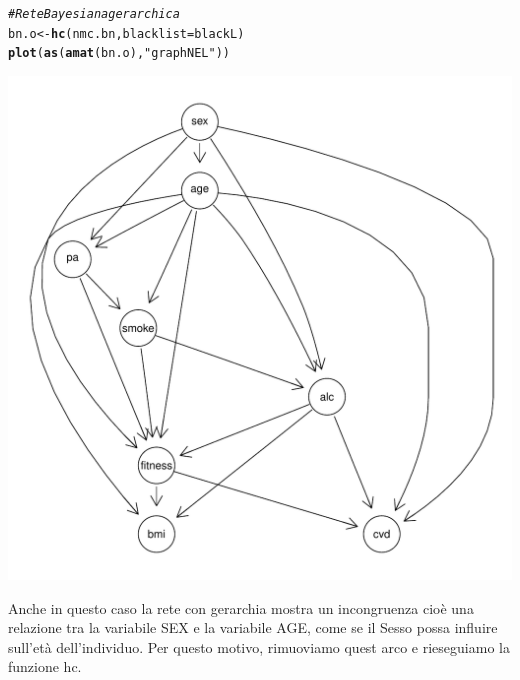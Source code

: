 \documentclass{article}\usepackage[]{graphicx}\usepackage[]{xcolor}
\makeatletter
\def\maxwidth{ %
  \ifdim\Gin@nat@width>\linewidth
    \linewidth
  \else
    \Gin@nat@width
  \fi
}
\newcommand{\hlstr}[1]{\textcolor[rgb]{0.192,0.494,0.8}{#1}}%
\newcommand{\hlcom}[1]{\textcolor[rgb]{0.678,0.584,0.686}{\textit{#1}}}%
\newcommand{\hlstd}[1]{\textcolor[rgb]{0.345,0.345,0.345}{#1}}%
\newcommand{\hlkwb}[1]{\textcolor[rgb]{0.69,0.353,0.396}{#1}}%
\newcommand{\hlkwc}[1]{\textcolor[rgb]{0.333,0.667,0.333}{#1}}%
\newcommand{\hlkwd}[1]{\textcolor[rgb]{0.737,0.353,0.396}{\textbf{#1}}}%
\newenvironment{kframe}{%
 \def\at@end@of@kframe{}%
 \ifinner\ifhmode%
  \def\at@end@of@kframe{\end{minipage}}%
  \begin{minipage}{\columnwidth}%
 \fi\fi%
 \def\FrameCommand##1{\hskip\@totalleftmargin \hskip-\fboxsep
 \colorbox{shadecolor}{##1}\hskip-\fboxsep
     \hskip-\linewidth \hskip-\@totalleftmargin \hskip\columnwidth}%
 \MakeFramed {\advance\hsize-\width
   \@totalleftmargin\z@ \linewidth\hsize
   \@setminipage}}%
 {\par\unskip\endMakeFramed%
 \at@end@of@kframe}
\newenvironment{knitrout}{}{} %
\makeatother
\begin{document}
\begin{knitrout}
\color{fgcolor}\begin{kframe}
\begin{alltt}
\hlcom{#Rete Bayesiana gerarchica}
\hlstd{bn.o} \hlkwb{<-} \hlkwd{hc}\hlstd{(nmc.bn,} \hlkwc{blacklist}\hlstd{=blackL)}
\hlkwd{plot}\hlstd{(}\hlkwd{as}\hlstd{(}\hlkwd{amat}\hlstd{(bn.o),} \hlstr{"graphNEL"}\hlstd{))}
\end{alltt}
\end{kframe}
\includegraphics[width=\maxwidth]{figure/Rete_bayesiana_gerarchica-1} 
\end{knitrout}
    
    Anche in questo caso la rete con gerarchia mostra un incongruenza cioè una
    relazione tra la variabile SEX e la variabile AGE, come se il Sesso possa
    influire sull'età dell'individuo. Per questo motivo, rimuoviamo quest arco
    e rieseguiamo la funzione hc.
    
\end{document}
